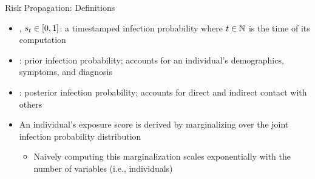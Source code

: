 \documentclass[11pt]{beamer}
\begin{document}
\begin{frame}{Risk Propagation: Definitions}
\begin{itemize}
  \item {}, $s_t \in [0, 1]$: a timestamped infection probability where $t \in \mathbb{N}$ is the time of its computation
  \pause
  \item {}: prior infection probability; accounts for an individual's demographics, symptoms, and diagnosis \citep{Briers2020, Menni2020}
  \pause
  \item {}: posterior infection probability; accounts for direct and indirect contact with others
  \pause
  \item An individual's exposure score is derived by marginalizing over the joint infection probability distribution
    \pause
    \begin{itemize}
      \item Naively computing this marginalization scales exponentially with the number of variables (i.e., individuals)
    \end{itemize}
\end{itemize}
\end{frame}
\end{document}
